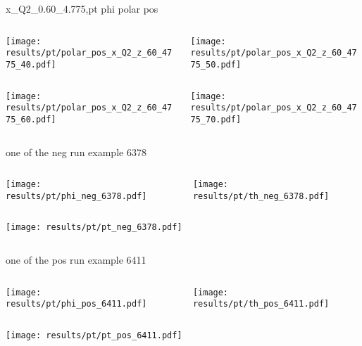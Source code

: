\begin{frame}{x\_Q2\_0.60\_4.775,pt phi polar pos}
\begin{columns}
\begin{column}[T]{0.5\textwidth}
\texttt{[image: results/pt/polar\_pos\_x\_Q2\_z\_60\_4775\_40.pdf]}
\end{column}
\begin{column}[T]{0.5\textwidth}
\texttt{[image: results/pt/polar\_pos\_x\_Q2\_z\_60\_4775\_50.pdf]}
\end{column}
\end{columns}
\begin{columns}
\begin{column}[T]{0.5\textwidth}
\texttt{[image: results/pt/polar\_pos\_x\_Q2\_z\_60\_4775\_60.pdf]}
\end{column}
\begin{column}[T]{0.5\textwidth}
\texttt{[image: results/pt/polar\_pos\_x\_Q2\_z\_60\_4775\_70.pdf]}
\end{column}
\end{columns}
\end{frame}
\begin{frame}{one of the neg run example 6378}
\begin{columns}
\begin{column}[T]{0.5\textwidth}
\texttt{[image: results/pt/phi\_neg\_6378.pdf]}
\end{column}
\begin{column}[T]{0.5\textwidth}
\texttt{[image: results/pt/th\_neg\_6378.pdf]}
\end{column}
\end{columns}
\begin{columns}
\begin{column}[T]{0.5\textwidth}
\texttt{[image: results/pt/pt\_neg\_6378.pdf]}
\end{column}
\begin{column}[T]{0.5\textwidth}
\end{column}
\end{columns}
\end{frame}
\begin{frame}{one of the pos run example 6411}
\begin{columns}
\begin{column}[T]{0.5\textwidth}
\texttt{[image: results/pt/phi\_pos\_6411.pdf]}
\end{column}
\begin{column}[T]{0.5\textwidth}
\texttt{[image: results/pt/th\_pos\_6411.pdf]}
\end{column}
\end{columns}
\begin{columns}
\begin{column}[T]{0.5\textwidth}
\texttt{[image: results/pt/pt\_pos\_6411.pdf]}
\end{column}
\begin{column}[T]{0.5\textwidth}
\end{column}
\end{columns}
\end{frame}
